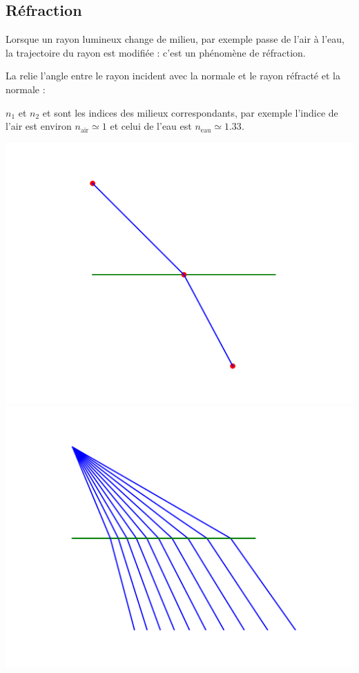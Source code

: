 \documentclass[11pt,class=report,crop=false]{standalone}
\begin{document}
\subsection{Réfraction}


Lorsque un rayon lumineux change de milieu, par exemple passe de l'air à l'eau, la trajectoire du rayon est modifiée : c'est un phénomène de réfraction.

La  relie l'angle entre le rayon incident avec la normale et le rayon réfracté et la normale :

$n_1$ et $n_2$ et sont les indices des milieux correspondants, par exemple l'indice de l'air est environ $n_{\text{air}} \simeq 1$ et celui de l'eau est $n_{\text{eau}} \simeq 1.33$.


 
\begin{center}
	\includegraphics[scale=\myscale,scale=0.5]{figures/refraction-1} \quad 
	\includegraphics[scale=\myscale,scale=0.5]{figures/refraction-2}			
\end{center}
\end{document}
